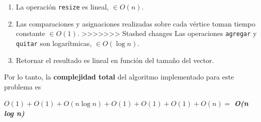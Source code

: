 \begin{enumerate}
   \item La operación \verb|resize| es lineal, $\in O(n)$.
% 
% 
% 
% 
% 
 
 
   \item Las comparaciones y asignaciones realizadas sobre cada vértice toman tiempo constante $\in O(1)$. 
>>>>>>> Stashed changes
   Las operaciones \verb|agregar| y \verb|quitar| son logarítmicas, $\in O(\log n)$.

   \item Retornar el resultado es lineal en función del tamaño del vector.
 \end{enumerate}


Por lo tanto, la \textbf{complejidad total} del algoritmo implementado para este problema es

\begin{center}
  $O(1) + O(1) + O(n \log n) + O(1) + O(1) + O(1) + O(n) =$ \textit{\textbf{O(n log n)}}
\end{center}


